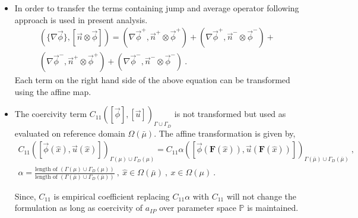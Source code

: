 \documentclass[graybox]{svmult}
\begin{document}
\begin{itemize}
\item In order to transfer the terms containing jump and average operator following approach is used in present analysis.
\begin{equation*}\label{jump_average_term_split}
\begin{split}
\left(\lbrace \nabla \overrightarrow{\phi} \rbrace , \left[ \overrightarrow{n} \otimes \overrightarrow{\phi}  \right]  \right) = \left( \nabla \overrightarrow{\phi}^+ , \overrightarrow{n}^+ \otimes \overrightarrow{\phi}^+ \right) + \left( \nabla \overrightarrow{\phi}^+ , \overrightarrow{n}^- \otimes \overrightarrow{\phi}^- \right) + \\ 
\left( \nabla \overrightarrow{\phi}^- , \overrightarrow{n}^+ \otimes \overrightarrow{\phi}^+ \right) + \left( \nabla \overrightarrow{\phi}^- , \overrightarrow{n}^- \otimes \overrightarrow{\phi}^- \right) \ .
\end{split}
\end{equation*}
Each term on the right hand side of the above equation can be transformed using the affine map.

\item The coercivity term $C_{11}\left( [\overrightarrow{\phi}],[\overrightarrow{u}] \right)_{\Gamma \cup \Gamma_D}$ is not transformed but used as evaluated on reference domain $\Omega(\bar{\mu})$. The affine transformation is given by,
\begin{equation*}
\begin{split}
C_{11}\left( [\overrightarrow{\phi}(\hat{x}),\overrightarrow{u}(\hat{x})] \right)_{\Gamma(\mu) \cup \Gamma_D(\mu)} = C_{11} \alpha \left( [\overrightarrow{\phi}(\bm{F}(\hat{x})),\overrightarrow{u}(\bm{F}(\hat{x}))] \right)_{\Gamma(\bar{\mu}) \cup \Gamma_D(\bar{\mu})} \ , \\
\alpha = \frac{\text{length of }\left( \Gamma(\mu) \cup \Gamma_D(\mu)\right)}{\text{length of }\left( \Gamma(\bar{\mu}) \cup \Gamma_D(\bar{\mu})\right)} \ , \ \hat{x} \in \Omega(\bar{\mu}) \ , \ x \in \Omega(\mu) \ .
\end{split}
\end{equation*}

Since, $C_{11}$ is empirical coefficient replacing $C_{11} \alpha$ with $C_{11}$ will not change the formulation as long as coercivity of $a_{IP}$ over parameter space $\mathbb{P}$ is maintained. 
\end{itemize}
\end{document}
